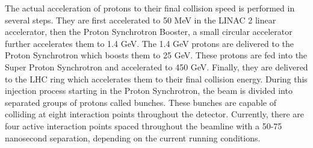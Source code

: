 The actual acceleration of protons to their final collision speed is performed in several steps. They are first accelerated to 50 MeV in the LINAC 2 linear accelerator, then the Proton Synchrotron Booster, a small circular accelerator further accelerates them to 1.4 GeV. The 1.4 GeV protons are delivered to the Proton Synchrotron which boosts them to 25 GeV. These protons are fed into the Super Proton Synchrotron and accelerated to 450 GeV. Finally, they are delivered to the LHC ring which accelerates them to their final collision energy. During this injection process starting in the Proton Synchrotron, the beam is divided into separated groups of protons called bunches. These bunches are capable of colliding at eight interaction points throughout the detector. Currently, there are four active interaction points spaced throughout the beamline with a 50-75 nanosecond separation, depending on the current running conditions.


